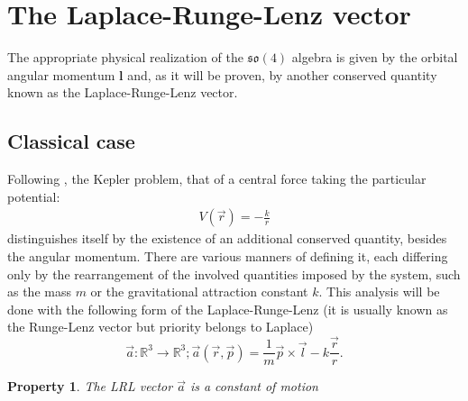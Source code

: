 \documentclass[12pt,a4paper]{report}
\newtheorem{property}{Property}[section]
\theoremstyle{definition}
\theoremstyle{remark}
\theoremstyle{remark}
\begin{document}
\section{The Laplace-Runge-Lenz vector}
The appropriate physical realization of the $\mathfrak{so}(4)$ algebra is given by the orbital angular momentum $\textbf{l}$ and, as it will be proven, by another conserved quantity known as the Laplace-Runge-Lenz vector. 
\subsection{Classical case}
Following \cite{goldstein}, the Kepler problem, that of a central force taking the particular potential:
\begin{align*}
V(\vec{r})=-\frac{k}{r}
\end{align*}
distinguishes itself by the existence of an additional conserved quantity, besides the angular momentum. There are various manners of defining it, each differing only by the rearrangement of the involved quantities imposed by the system, such as the mass $m$ or the gravitational attraction constant $k$. This analysis will be done with the following form of the Laplace-Runge-Lenz (it is usually known as the Runge-Lenz vector but priority belongs to Laplace)
\begin{equation}
\vec{a}:\mathbb{R}^3 \rightarrow \mathbb{R}^3 ; \vec{a}(\vec{r},\vec{p})=\frac{1}{m}\vec{p}\times\vec{l}-k\frac{\vec{r}}{r}.
\end{equation}
\begin{property}\label{pclrl1}
The LRL vector $\vec{a}$ is a constant of motion
\end{property}
\end{document}
